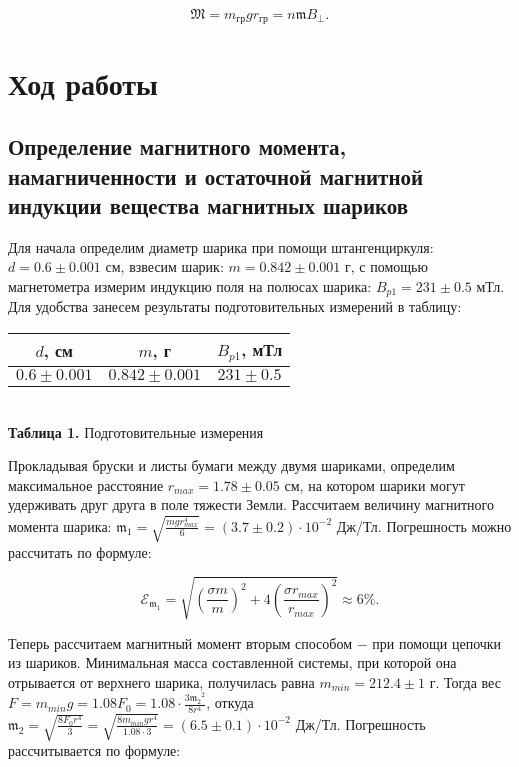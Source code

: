 \documentclass[a4paper,12pt]{article} %
\begin{document}
$$
\mathfrak{M} = m_\text{гр}gr_\text{гр} = n\mathfrak{m}B_{\perp}.
$$

\section{Ход работы}

\subsection{Определение магнитного момента, намагниченности и остаточной магнитной индукции вещества магнитных шариков}

\hfill \break Для начала определим диаметр шарика при помощи штангенциркуля: $d = 0.6 \pm 0.001$ см, взвесим шарик: $m = 0.842  \pm 0.001$ г, с помощью магнетометра измерим индукцию поля на полюсах шарика: $B_{p1} = 231 \pm 0.5$ мТл. Для удобства занесем результаты подготовительных измерений в таблицу:

\begin{center}
\begin{tabular}{|c|c|c|}\hline
$d$, см&$m$, г&$B_{p1}$, мТл\\\hline
$0.6 \pm 0.001$&$0.842 \pm 0.001$&$231 \pm 0.5$\\\hline
\end{tabular}\\
\hfill \break \textbf {Таблица 1.} Подготовительные измерения~\\
\end{center}

\hfill \break Прокладывая бруски и листы бумаги между двумя шариками, определим максимальное расстояние $r_{max} = 1.78 \pm 0.05$ см, на котором шарики могут удерживать друг друга в поле тяжести Земли. Рассчитаем величину магнитного момента шарика: $\mathfrak{m}_{1} = \sqrt{\frac{mgr^4_{max}}{6}} = (3.7 \pm 0.2) \cdot 10^{-2}$ Дж/Тл. Погрешность можно рассчитать по формуле:

$$
\mathcal{E}_{\mathfrak{m}_{1}} = \sqrt{(\frac{\sigma{m}}{m})^2 + 4(\frac{\sigma{r_{max}}}{r_{max}})^2} \approx 6 \%.
$$

\hfill \break Теперь рассчитаем магнитный момент вторым способом $-$ при помощи цепочки из шариков. Минимальная масса составленной системы, при которой она отрывается от верхнего шарика, получилась равна $m_{min} = 212.4 \pm 1$ г. Тогда вес $F = m_{min}g = 1.08F_{0} = 1.08 \cdot \frac{3\mathfrak{m_{2}}^2}{8r^4}$, откуда $\mathfrak{m}_{2} = \sqrt{\frac{8F_{0}r^4}{3}} = \sqrt{\frac{8m_{min}gr^4}{1.08 \cdot 3}} = (6.5 \pm 0.1) \cdot 10^{-2}$ Дж/Тл. Погрешность рассчитывается по формуле:
\end{document}

